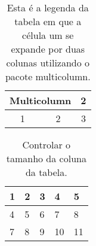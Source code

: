 \documentclass[a4paper, 12pt]{article}
\begin{document}
    \begin{table}[H]
      \caption{Esta é a legenda da tabela em que a célula um se expande por duas colunas 
      utilizando o pacote multicolumn.}
      \centering %
      
      \begin{tabular}{|c|c|c|} %

      \hline %
      
      \multicolumn{2}{|c|}{Multicolumn} & 2\\ \hline
      1 & 2 & 3\\
      \hline
      
      \end{tabular}
  \end{table}

  
    \begin{table}[H]
      \caption{Controlar o tamanho da coluna da tabela.}
      \centering %
      
      \begin{tabular}{|p{2.5cm}|p{2cm}|p{1.5cm}|p{1cm}|p{0.5cm}|} %

      \hline
      1 & 2 & 3 & 4 & 5\\  \hline
      4 & 5 & 6 & 7 & 8\\ \hline
      7 & 8 & 9 & 10 & 11\\  \hline
      
      \end{tabular}
  \end{table}
  
  
\end{document}
